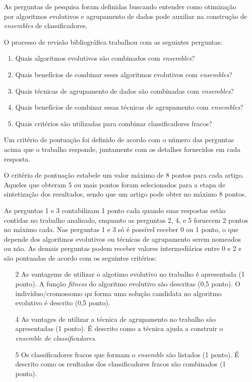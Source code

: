 \documentclass[12pt]{report}
\begin{document}
As perguntas de pesquisa foram definidas buscando entender como otimização por algoritmos evolutivos e agrupamento de dados pode auxiliar na construção de \textit{ensembles} de classificadores.

O processo de revisão bibliográfica trabalhou com as seguintes perguntas:

\begin{enumerate}
    \item Quais algoritmos evolutivos são combinados com \textit{ensembles}?
    \item Quais benefícios de combinar esses algoritmos evolutivos com \textit{ensembles}?
    \item Quais técnicas de agrupamento de dados são combinadas com \textit{ensembles}?
    \item Quais benefícios de combinar essas técnicas de agrupamento com \textit{ensembles}?
    \item Quais critérios são utilizadas para combinar classificadores fracos?
\end{enumerate}

Um critério de pontuação foi definido de acordo com o número das perguntas acima que o trabalho responde, juntamente com os detalhes fornecidos em cada resposta.

O critério de pontuação estabele um valor máximo de 8 pontos para cada artigo. Aqueles que obteram 5 ou mais pontos foram selecionados para a etapa de sintetização dos resultados, sendo que um artigo pode obter no máximo 8 pontos.

As perguntas 1 e 3 contabilizam 1 ponto cada quando suas respostas estão contidas no trabalho analisado, enquanto as perguntas 2, 4, e 5 fornecem 2 pontos no máximo cada. Nas perguntas 1 e 3 só é possível receber 0 ou 1 ponto, o que depende dos algoritmos evolutivos ou técnicas de agrupamento serem nomeados ou não. As demais perguntas podem receber valores intermediários entre 0 e 2 e são pontuadas de acordo com os seguintes critérios:

\begin{enumerate}
  \item[2] As vantagems de utilizar o algotimo evolutivo no trabalho é apresentada (1 ponto). A função \textit{fitness} do algoritmo evolutivo são descritas (0,5 ponto). O indivíduo/cromossomo qu forma uma solução candidata no algoritmo evolutivo é descrito (0,5 ponto).
  \item[4] As vantages de utilizar a técnica de agrupamento no trabalho são apresentadas (1 ponto). É descrito como a técnica ajuda a construir o \textit{ensemble de classificadores}.
  \item[5] Os classificadores fracos que formam o \textit{ensemble} são listados (1 ponto). É descrito como os reultados dos classificadores fracos são combinados (1 ponto).
\end{enumerate}
\end{document}
